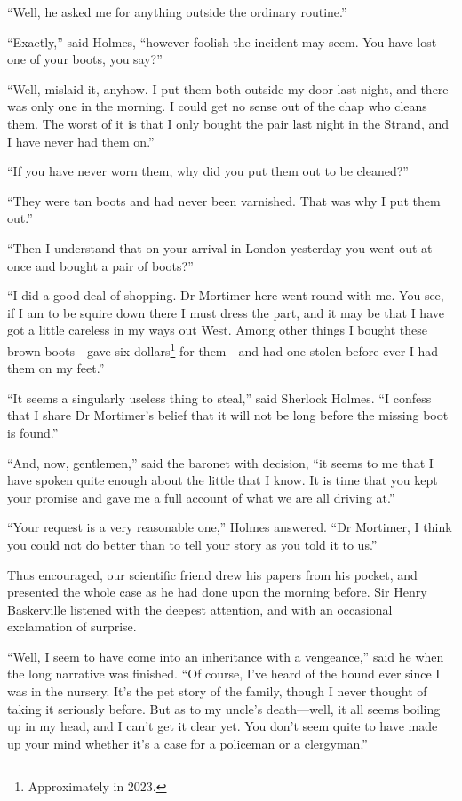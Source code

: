 \documentclass[paper=5.5in:8.5in,BCOR=7mm,twoside,DIV=calc,12pt,usegeometry,openany,chapterprefix,endperiod,headings=big]{scrbook} %
\begin{document}
\enquote{Well, he asked me for anything outside the ordinary routine.}

\enquote{Exactly,} said Holmes, \enquote{however foolish the incident may seem. You have lost one of your boots, you say?}

\enquote{Well, mislaid it, anyhow. I put them both outside my door last night, and there was only one in the morning. I could get no sense out of the chap who cleans them. The worst of it is that I only bought the pair last night in the Strand, and I have never had them on.}

\enquote{If you have never worn them, why did you put them out to be cleaned?}

\enquote{They were tan boots and had never been varnished. That was why I put them out.}

\enquote{Then I understand that on your arrival in London yesterday you went out at once and bought a pair of boots?}

\enquote{I did a good deal of shopping. Dr Mortimer here went round with me. You see, if I am to be squire down there I must dress the part, and it may be that I have got a little careless in my ways out West. Among other things I bought these brown boots---gave six dollars\footnote{Approximately  in 2023.} for them---and had one stolen before ever I had them on my feet.}

\enquote{It seems a singularly useless thing to steal,} said Sherlock Holmes. \enquote{I confess that I share Dr Mortimer's belief that it will not be long before the missing boot is found.}

\enquote{And, now, gentlemen,} said the baronet with decision, \enquote{it seems to me that I have spoken quite enough about the little that I know. It is time that you kept your promise and gave me a full account of what we are all driving at.}

\enquote{Your request is a very reasonable one,} Holmes answered. \enquote{Dr Mortimer, I think you could not do better than to tell your story as you told it to us.}

Thus encouraged, our scientific friend drew his papers from his pocket, and presented the whole case as he had done upon the morning before. Sir Henry Baskerville listened with the deepest attention, and with an occasional exclamation of surprise.

\enquote{Well, I seem to have come into an inheritance with a vengeance,} said he when the long narrative was finished. \enquote{Of course, I've heard of the hound ever since I was in the nursery. It's the pet story of the family, though I never thought of taking it seriously before. But as to my uncle's death---well, it all seems boiling up in my head, and I can't get it clear yet. You don't seem quite to have made up your mind whether it's a case for a policeman or a clergyman.}
\end{document}
